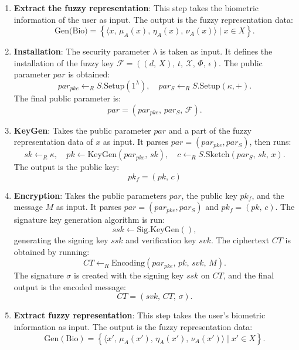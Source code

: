 \documentclass[graybox]{svmult}
\begin{document}
\begin{enumerate}
    \item \textbf{Extract the fuzzy representation}: This step takes the biometric information of the user as input. The output is the fuzzy representation data:
          \[
              \text{Gen(Bio)} = \left\{ \langle x,\, \mu_A(x),\, \eta_A(x),\, \nu_A(x) \rangle \mid x \in X \right\}.
          \]

    \item \textbf{Installation}: The security parameter \( \lambda \) is taken as input. It defines the \break installation of the fuzzy key \( \mathcal{F} = ((d,\, X),\, t,\, \mathcal{X},\, \varPhi,\, \epsilon) \). The public parameter \(  par \) is \allowbreak obtained:
          \[
              par_{pke} \leftarrow_R S.\text{Setup}(1^\lambda), \quad par_S \leftarrow_R S.\text{Setup}(\kappa, +).
          \]
          The final public parameter is:
          \[
              par  = (par_{pke},\, par_S,\, \mathcal{F}).
          \]

    \item \textbf{KeyGen}: Takes the public parameter \(  par \) and a part of the fuzzy representation data of \( x \) as input. It parses \( par  = (par_{pke}, par_S) \), then runs:
          \[
              sk \leftarrow_R \kappa, \quad pk \leftarrow \text{KeyGen}(par_{pke}, \, sk), \quad c \leftarrow_R S.\text{Sketch}(par_S, \, sk, \, x).
          \]
          The output is the public key:
          \[
              pk_f = (pk,\, c)
          \]

    \item \textbf{Encryption}: Takes the public parameters \(  par \), the public key \( pk_f \), and the \allowbreak message \( M \) as input. It parses \( par  = ( par_{pke}, par_S) \) and \( pk_f = (pk, \, c) \). The \allowbreak signature key generation algorithm is run:
          \[
              ssk \leftarrow \text{Sig.KeyGen}(),
          \]
          generating the signing key $ssk$ and verification key $svk$. The ciphertext $CT$ is obtained by running:
          \[
              CT \leftarrow_R \text{Encoding}(par_{pke}, \, pk, \, svk, \, M).
          \]
          The signature $\sigma$ is created with the signing key $ssk$ on $CT$, and the final output is the encoded message:
          \[
              CT = (svk, \, CT, \, \sigma).
          \]

    \item \textbf{Extract fuzzy representation}: This step takes the user's biometric information as input. The output is the fuzzy representation data:
          \[
              \text{Gen}(\text{Bio}) = \left\{ \langle x', \, \mu_A(x'), \, \eta_A(x'), \, \nu_A(x') \rangle \mid x' \in X \right\}.
          \]


\end{enumerate}
\end{document}
